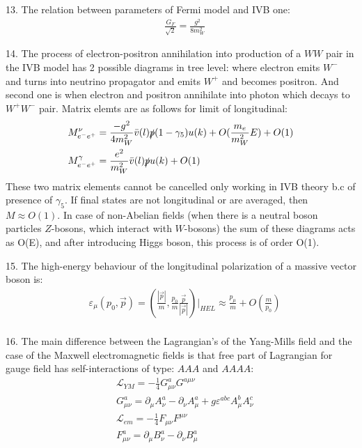 13. The relation between parameters of Fermi model and IVB one:
\begin{equation}
\begin{split}
&\frac{G_F}{\sqrt{2}}=\frac{g^2}{8m_W^2}
\end{split}
\end{equation}

14. The process of electron-positron annihilation into production of a $WW$ pair in the IVB model has 2 possible diagrams in tree level: where electron emits $W^-$ and turns into neutrino propagator and emits $W^+$ and becomes positron. And second one is when electron and positron annihilate into photon which decays to $W^+W^-$ pair. Matrix elemts are as follows for limit of longitudinal:
\begin{equation}
\begin{split}
&M^\nu_{e^-e^+} = \frac{-g^2}{4m_W^2}\Bar{v}(l)\slashed{p}(1-\gamma_5)u(k)+O(\frac{m_e}{m_W^2}E)+O(1)\\
&M^\gamma_{e^-e^+} = \frac{e^2}{m_W^2}\Bar{v}(l)\slashed{p}u(k)+O(1)\\
\end{split}
\end{equation}
These two matrix elements cannot be cancelled only working in IVB theory b.c of presence of $\gamma_5$. If final states are not longitudinal or are averaged, then $M\approx O(1)$. In case of non-Abelian fields (when there is a neutral boson particles $Z$-bosons, which interact with $W$-bosons) the sum of these diagrams acts as O(E), and after introducing Higgs boson, this process is of order O(1).

15. The high-energy behaviour of the longitudinal polarization of a massive vector boson is: 
\begin{equation}
\begin{split}
&\varepsilon_\mu(p_0,\Vec{p}) = (\frac{|\Vec{p}|}{m},\frac{p_0}{m}\frac{\Vec{p}}{|\Vec{p}|}) |_{HEL} \approx \frac{p_\mu}{m}+O(\frac{m}{p_0})\\
\end{split}
\end{equation}

16. The main difference between the Lagrangian's of the Yang-Mills field and the case of the Maxwell electromagnetic fields is that free part of Lagrangian for gauge field has self-interactions of type: $AAA$ and $AAAA$:
\begin{equation}
\begin{split}
&\mathcal{L}_{YM} = -\frac{1}{4}G^a_{\mu\nu}G^{a\mu\nu}\\
&G^a_{\mu\nu} =\partial_\mu A_\nu^a - \partial_\nu A_\mu^a +g\varepsilon^{abc}A^b_{\mu}A^c_{\nu}\\
&\mathcal{L}_{em} = -\frac{1}{4}F_{\mu\nu}F^{\mu\nu}\\
&F^a_{\mu\nu} =\partial_\mu B_\nu^a - \partial_\nu B_\mu^a \\
\end{split}
\end{equation}

